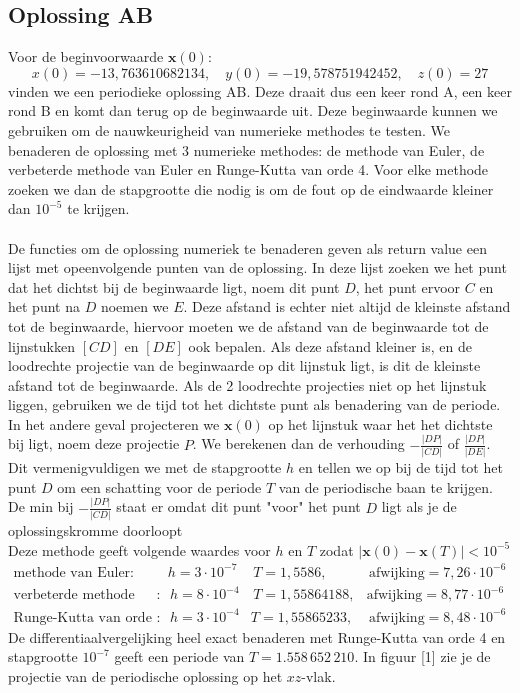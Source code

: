 \documentclass[12pt, a4paper]{article}
\theoremstyle{definition}
\begin{document}
\subsection{Oplossing AB}
Voor de beginvoorwaarde $\textbf{x}(0)$:
$$x(0) =−13,763 610 682 134, \quad y(0) =−19,578 751 942 452, \quad   z(0) = 27$$
vinden we een periodieke oplossing AB. Deze draait dus een keer rond A, een keer rond B en komt dan terug op de beginwaarde uit. Deze beginwaarde kunnen we gebruiken om de nauwkeurigheid van numerieke methodes te testen. We benaderen de oplossing met 3 numerieke methodes: de methode van Euler, de verbeterde methode van Euler en Runge-Kutta van orde 4. Voor elke methode zoeken we dan de stapgrootte die nodig is om de fout op de eindwaarde kleiner dan $10^{-5}$ te krijgen.\\
\\
De functies om de oplossing numeriek te benaderen geven als return value een lijst met opeenvolgende punten van de oplossing. In deze lijst zoeken we het punt dat het dichtst bij de beginwaarde ligt, noem dit punt $D$, het punt ervoor $C$ en het punt na $D$ noemen we $E$. Deze afstand is echter niet altijd de kleinste afstand tot de beginwaarde, hiervoor moeten we de afstand van de beginwaarde tot de lijnstukken $[CD]$ en $[DE]$ ook bepalen. Als deze afstand kleiner is, en de loodrechte projectie van de beginwaarde op dit lijnstuk ligt, is dit de kleinste afstand tot de beginwaarde. Als de 2 loodrechte projecties niet op het lijnstuk liggen, gebruiken we de tijd tot het dichtste punt als benadering van de periode. In het andere geval projecteren we $\textbf{x}(0)$ op het lijnstuk waar het het dichtste bij ligt, noem deze projectie $P$. We berekenen dan de verhouding $-\frac{|DP|}{|CD|}$ of $\frac{|DP|}{|DE|}$. Dit vermenigvuldigen we met de stapgrootte $h$ en tellen we op bij de tijd tot het punt $D$ om een schatting voor de periode $T$ van de periodische baan te krijgen. De min bij $-\frac{|DP|}{|CD|}$ staat er omdat dit punt "voor" het punt $D$ ligt als je de oplossingskromme doorloopt\\
Deze methode geeft volgende waardes voor $h$ en $T$ zodat $|\textbf{x}(0) - \textbf{x}(T)| < 10^{-5}$
\begin{align*}
\text{methode van Euler}: & h = 3 \cdot 10^{-7} & \, T = 1,5586, &\, \text{afwijking} = 7,26 \cdot 10^{-6}\\
\text{verbeterde methode van Euler}: & \, h = 8 \cdot 10^{-4} &\, T = 1,55864188, & \text{afwijking} = 8,77 \cdot 10^{-6}\\
\text{Runge-Kutta van orde 4}: &\, h = 3 \cdot 10^{-4} & T = 1,55865233, &\, \text{afwijking} = 8,48 \cdot 10^{-6}
\end{align*}
De differentiaalvergelijking heel exact benaderen met Runge-Kutta van orde 4 en stapgrootte $10^{-7}$ geeft een periode van $T=1.558 \, 652 \, 210$. In figuur [1] zie je de projectie van de periodische oplossing op het $xz$-vlak.
\end{document}
